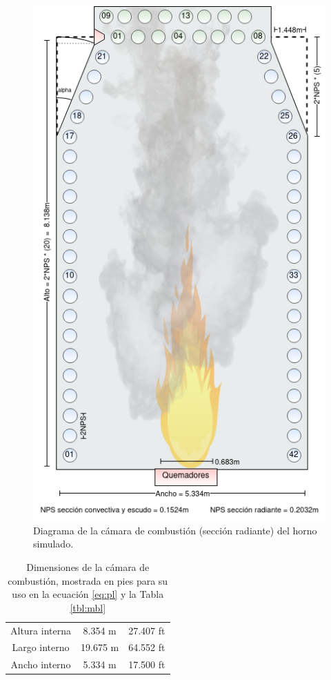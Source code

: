 \begin{figure}[hbt] \begin{center}
\includegraphics[scale=0.455]{images/firebox}
\caption[Diagrama de la cámara de combustión]{Diagrama de la cámara de combustión (sección radiante) del horno simulado.}
\label{fig:firebox} \end{center} \end{figure}
\begin{table}[H] \begin{center}
\caption[Dimensiones de la cámara de combustión]{Dimensiones de la cámara de combustión, mostrada en pies para su uso en la ecuación \ref{eq:pl} y la Tabla \ref{tbl:mbl}}
\label{tbl:firebox} \begin{tabular}{c|c|c}
Altura interna	&  8.354 m & 27.407 ft\\
Largo interno 	& 19.675 m & 64.552 ft\\
Ancho interno 	&  5.334 m & 17.500 ft\\
\end{tabular} \end{center} \end{table}
